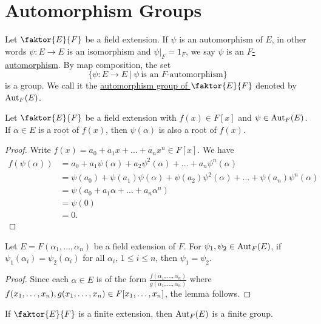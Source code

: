 \documentclass[11pt]{article}
\newcommand{\quotient}[2]{\faktor{#1}{#2}}
\begin{document}
\section{Automorphism Groups}
\begin{definition}
Let $\quotient{E}{F}$ be a field extension. If $\psi$ is an automorphism of $E$,
in other words $\psi: E \to E$ is an isomorphism and $\psi|_F = 1_F$, we say
$\psi$ is an \underline{$F$-automorphism}. By map composition, the set
\begin{equation*}
\{\psi:E\to E\>|\>\psi\>\text{is an }F\text{-automorphism}\}
\end{equation*}
is a group. We call it the \underline{automorphism group of $\quotient{E}{F}$}
denoted by $\operatorname{Aut}_F(E)$.
\end{definition}
\begin{lemma}
Let $\quotient{E}{F}$ be a field extension with $f(x) \in F[x]$ and $\psi \in
\operatorname{Aut}_F(E)$. If $\alpha \in E$ is a root of $f(x)$, then $\psi(\alpha)$ is also a
root of $f(x)$.
\label{lemma40}
\end{lemma}
\begin{proof}
Write $f(x) = a_0 + a_1x + \dots + a_nx^n \in F[x]$. We have
\begin{align*}
f(\psi(\alpha)) &= a_0 + a_1\psi(\alpha) + a_2\psi^2(\alpha) + \dots +
a_n\psi^n(\alpha)\\
&= \psi(a_0) + \psi(a_1)\psi(\alpha) + \psi(a_2)\psi^2(\alpha) + \dots +
\psi(a_n)\psi^n(\alpha)\\ 
&= \psi(a_0 + a_1\alpha + \dots + a_n\alpha^n)\\ 
&= \psi(0)\\ &= 0.
\end{align*}
\end{proof}
\begin{lemma}
Let $E = F(\alpha_1, \dots, \alpha_n)$ be a field extension of $F$. For
$\psi_1,\psi_2 \in \operatorname{Aut}_F(E)$, if $\psi_1(\alpha_i) = \psi_2(\alpha_i)$ for all
$\alpha_i$, $1 \leq i \leq n$, then $\psi_1 = \psi_2$.
\label{lemma41}
\end{lemma}
\begin{proof}
Since each $\alpha \in E$ is of the form $\displaystyle \frac{f(\alpha_1, \dots,
\alpha_n)}{g(\alpha_1, \dots, \alpha_n)}$ where $f(x_1, \dots, x_n), g(x_1,
\dots, x_n)\in\\ F[x_1, \dots, x_n]$, the lemma follows.
\end{proof}
\begin{corollary}
If $\quotient{E}{F}$ is a finite extension, then $\operatorname{Aut}_F(E)$ is a finite group.
\label{corollary42}
\end{corollary}
\end{document}
